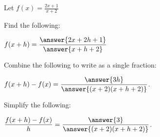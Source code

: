 \documentclass{ximera}
\author{Bobby Ramsey}
\begin{document}
\begin{exercise}
	Let $\displaystyle f(x) = \frac{2x+1}{x+2}$			
	
		Find the following:
		
		$\displaystyle f(x+h) = \frac{\answer{2x+2h+1}}{\answer{x+h+2}}$
		
		\begin{exercise}
		
			Combine the following to write as a single fraction:
			
			$\displaystyle f(x+h)-f(x) = \frac{\answer{3h}}{\answer{(x+2)(x+h+2)}}$.
			\begin{exercise}
				Simplify the following:
				
				$\displaystyle \frac{f(x+h)-f(x)}{h} = \frac{\answer{3}}{\answer{(x+2)(x+h+2)}}$.
			\end{exercise}
	\end{exercise}
\end{exercise}
	
\end{document}
